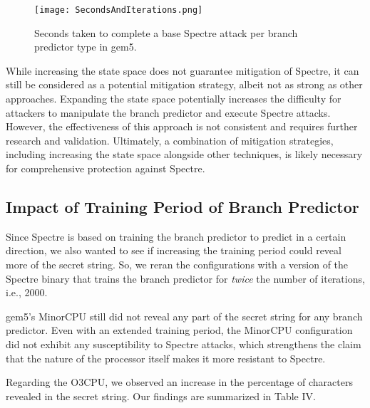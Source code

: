 \documentclass[twocolumn,showpacs,%
  nofootinbib,aps,superscriptaddress,%
  eqsecnum,prd,notitlepage,showkeys,10pt]{revtex4-1}
\begin{document}
\begin{figure}
    \centering
    \texttt{[image: SecondsAndIterations.png]}
    \caption{Seconds taken to complete a base Spectre attack per branch predictor type in gem5.}
\end{figure}

While increasing the state space does not guarantee mitigation of Spectre, it can still be considered as a potential mitigation strategy, albeit not as strong as other approaches. Expanding the state space potentially increases the difficulty for attackers to manipulate the branch predictor and execute Spectre attacks. However, the effectiveness of this approach is not consistent and requires further research and validation. Ultimately, a combination of mitigation strategies, including increasing the state space alongside other techniques, is likely necessary for comprehensive protection against Spectre.

\subsection{Impact of Training Period of Branch Predictor}

Since Spectre is based on training the branch predictor to predict in a certain direction, we also wanted to see if increasing the training period could reveal more of the secret string. So, we reran the configurations with a version of the Spectre binary that trains the branch predictor for \textit{twice} the number of iterations, i.e., 2000.

gem5's MinorCPU still did not reveal any part of the secret string for any branch predictor. Even with an extended training period, the MinorCPU configuration did not exhibit any susceptibility to Spectre attacks, which strengthens the claim that the nature of the processor itself makes it more resistant to Spectre.

Regarding the O3CPU, we observed an increase in the percentage of characters revealed in the secret string. Our findings are summarized in Table IV.
\end{document}
